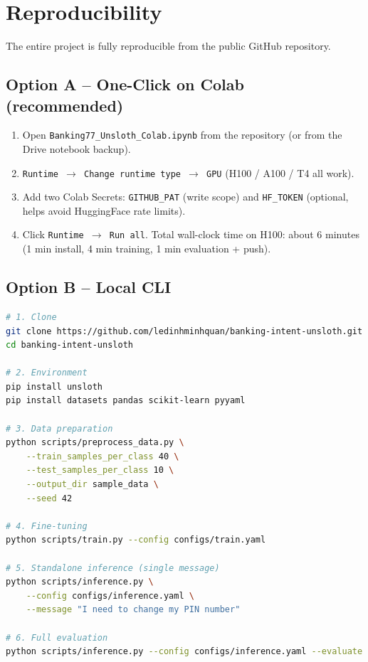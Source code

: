 \documentclass[12pt,a4paper]{article}
\begin{document}
\section{Reproducibility}
\label{sec:repro}

The entire project is fully reproducible from the public GitHub repository.

\subsection{Option A -- One-Click on Colab (recommended)}

\begin{enumerate}[noitemsep]
    \item Open \texttt{Banking77\_Unsloth\_Colab.ipynb} from the repository
          (or from the Drive notebook backup).
    \item \texttt{Runtime $\rightarrow$ Change runtime type $\rightarrow$ GPU}
          (H100 / A100 / T4 all work).
    \item Add two Colab Secrets: \texttt{GITHUB\_PAT} (write scope) and
          \texttt{HF\_TOKEN} (optional, helps avoid HuggingFace rate limits).
    \item Click \texttt{Runtime $\rightarrow$ Run all}. Total wall-clock time
          on H100: about 6 minutes (1 min install, 4 min training, 1 min
          evaluation + push).
\end{enumerate}

\subsection{Option B -- Local CLI}

\begin{lstlisting}[language=bash,caption={Local reproduction commands (Linux / WSL).}]
# 1. Clone
git clone https://github.com/ledinhminhquan/banking-intent-unsloth.git
cd banking-intent-unsloth

# 2. Environment
pip install unsloth
pip install datasets pandas scikit-learn pyyaml

# 3. Data preparation
python scripts/preprocess_data.py \
    --train_samples_per_class 40 \
    --test_samples_per_class 10 \
    --output_dir sample_data \
    --seed 42

# 4. Fine-tuning
python scripts/train.py --config configs/train.yaml

# 5. Standalone inference (single message)
python scripts/inference.py \
    --config configs/inference.yaml \
    --message "I need to change my PIN number"

# 6. Full evaluation
python scripts/inference.py --config configs/inference.yaml --evaluate
\end{lstlisting}
\end{document}

